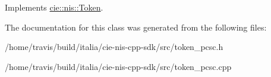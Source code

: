 Implements \hyperlink{classcie_1_1nis_1_1Token_a90c1d8936133fc35b1826b7eebbd13ff}{cie\-::nis\-::\-Token}.



The documentation for this class was generated from the following files\-:\begin{DoxyCompactItemize}
\item 
/home/travis/build/italia/cie-\/nis-\/cpp-\/sdk/src/token\-\_\-pcsc.\-h\item 
/home/travis/build/italia/cie-\/nis-\/cpp-\/sdk/src/token\-\_\-pcsc.\-cpp\end{DoxyCompactItemize}
